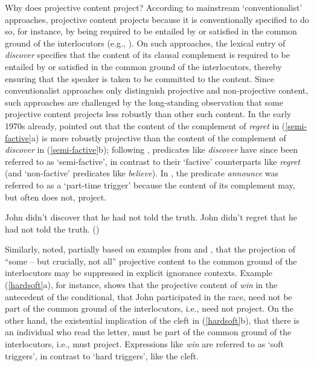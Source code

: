 \documentclass[11pt,fleqn]{article}
\newcommand{\6}{\mbox{$[\hspace*{-.6mm}[$}}
\newcommand{\9}{\mbox{$]\hspace*{-.6mm}]$}}
\begin{document}
Why does projective content project? According to mainstream `conventionalist' approaches, projective content projects because it is conventionally specified to do so, for instance, by being required to be entailed by or satisfied in the common ground of the interlocutors (e.g., \citealt{heim83,vds92,geurts99}). On such approaches, the lexical entry of {\em discover} specifies that the content of its clausal complement is required to be entailed by or satisfied in the common ground of the interlocutors, thereby ensuring that the speaker is taken to be committed to the content. Since conventionalist approaches only distinguish projective and non-projective content, such approaches are challenged by the long-standing observation that some projective content projects less robustly than other such content. In the early 1970s already, \citet{karttunen71b} pointed out that the content of the complement of {\em regret} in (\ref{semi-factive}a) is more robustly projective than the content of the complement of {\em discover} in (\ref{semi-factive}b); following \citealt{karttunen71b}, predicates like {\em discover} have since been referred to as `semi-factive', in contrast to their `factive' counterparts like {\em regret} (and `non-factive' predicates like {\em believe}). In \citealt{schlenker10}, the predicate {\em announce} was referred to as a `part-time trigger' because the content of its complement may, but often does not, project.

\begin{exe}
\ex\label{semi-factive}
\begin{xlist}
\ex John didn't discover that he had not told the truth.  
\ex John didn't regret that he had not told the truth.
\hfill (\citealt[63]{karttunen71b})

\end{xlist}
\end{exe}

Similarly, \citet[432]{simons01} noted, partially based on examples from \citealt{ccmg90} and \citealt{geurts94}, that the projection of ``some -- but crucially, not all'' projective content to the common ground of the interlocutors may be suppressed in explicit ignorance contexts. Example (\ref{hardsoft}a), for instance, shows that the projective content of {\em win} in the antecedent of the conditional, that John participated in the race, need not be part of the common ground of the interlocutors, i.e., need not project. On the other hand, the existential implication of the cleft in (\ref{hardsoft}b), that there is an individual who read the letter, must be part of the common ground of the interlocutors, i.e., must project. Expressions like {\em win} are referred to as `soft triggers', in contrast to `hard triggers', like the cleft.
\end{document}
